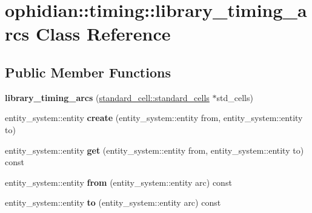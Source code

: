 \hypertarget{classophidian_1_1timing_1_1library__timing__arcs}{\section{ophidian\-:\-:timing\-:\-:library\-\_\-timing\-\_\-arcs Class Reference}
\label{classophidian_1_1timing_1_1library__timing__arcs}
}
\subsection*{Public Member Functions}
\begin{DoxyCompactItemize}
\item 
\hypertarget{classophidian_1_1timing_1_1library__timing__arcs_a132a07658041f3c137bfd932a74e9a4f}{{\bfseries library\-\_\-timing\-\_\-arcs} (\hyperlink{classophidian_1_1standard__cell_1_1standard__cells}{standard\-\_\-cell\-::standard\-\_\-cells} $\ast$std\-\_\-cells)}\label{classophidian_1_1timing_1_1library__timing__arcs_a132a07658041f3c137bfd932a74e9a4f}

\item 
\hypertarget{classophidian_1_1timing_1_1library__timing__arcs_a92f1ab96dcca8941c37f01ba6a83db2c}{entity\-\_\-system\-::entity {\bfseries create} (entity\-\_\-system\-::entity from, entity\-\_\-system\-::entity to)}\label{classophidian_1_1timing_1_1library__timing__arcs_a92f1ab96dcca8941c37f01ba6a83db2c}

\item 
\hypertarget{classophidian_1_1timing_1_1library__timing__arcs_a53b0f7117d44623f3032e3e6a7399b55}{entity\-\_\-system\-::entity {\bfseries get} (entity\-\_\-system\-::entity from, entity\-\_\-system\-::entity to) const }\label{classophidian_1_1timing_1_1library__timing__arcs_a53b0f7117d44623f3032e3e6a7399b55}

\item 
\hypertarget{classophidian_1_1timing_1_1library__timing__arcs_a53c5c0146362468875f3d1d97a9c36ef}{entity\-\_\-system\-::entity {\bfseries from} (entity\-\_\-system\-::entity arc) const }\label{classophidian_1_1timing_1_1library__timing__arcs_a53c5c0146362468875f3d1d97a9c36ef}

\item 
\hypertarget{classophidian_1_1timing_1_1library__timing__arcs_a3beff13bb6f8cefb42428c554bbfab5a}{entity\-\_\-system\-::entity {\bfseries to} (entity\-\_\-system\-::entity arc) const }\label{classophidian_1_1timing_1_1library__timing__arcs_a3beff13bb6f8cefb42428c554bbfab5a}


\end{DoxyCompactItemize}
